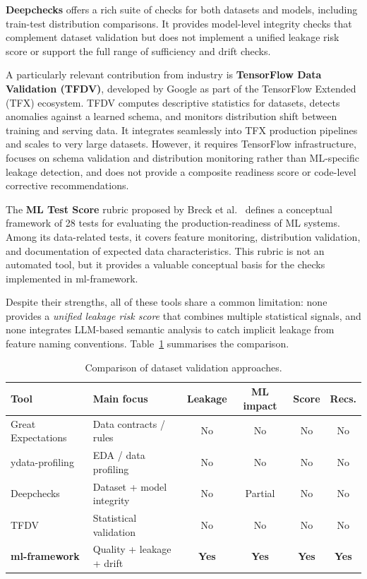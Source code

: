 \documentclass[12pt,a4paper]{report}
\newcommand{\tblhead}{\rowcolor{tblHeadBg}\color{white}\bfseries}
\begin{document}
\textbf{Deepchecks} \cite{deepchecks} offers a rich suite of checks for both datasets and
models, including train-test distribution comparisons.  It provides model-level integrity
checks that complement dataset validation but does not implement a unified leakage risk
score or support the full range of sufficiency and drift checks.

A particularly relevant contribution from industry is \textbf{TensorFlow Data Validation
(TFDV)}, developed by Google as part of the TensorFlow Extended (TFX) ecosystem.  TFDV
computes descriptive statistics for datasets, detects anomalies against a learned schema, and
monitors distribution shift between training and serving data.  It integrates seamlessly into
TFX production pipelines and scales to very large datasets.  However, it requires TensorFlow
infrastructure, focuses on schema validation and distribution monitoring rather than ML-specific
leakage detection, and does not provide a composite readiness score or code-level corrective
recommendations.

The \textbf{ML Test Score} rubric proposed by Breck et al.\ \cite{breck2019} defines a
conceptual framework of 28 tests for evaluating the production-readiness of ML systems.
Among its data-related tests, it covers feature monitoring, distribution validation, and
documentation of expected data characteristics.  This rubric is not an automated tool, but
it provides a valuable conceptual basis for the checks implemented in ml-framework.

Despite their strengths, all of these tools share a common limitation: none provides a
\emph{unified leakage risk score} that combines multiple statistical signals, and none integrates
LLM-based semantic analysis to catch implicit leakage from feature naming conventions.
Table~\ref{tab:tool_comparison} summarises the comparison.

\begin{table}[!ht]
\centering
\caption{Comparison of dataset validation approaches.}
\label{tab:tool_comparison}
\scriptsize
{}
\begin{tabularx}{\textwidth}{lXcccc}
\toprule
\tblhead \textbf{Tool} & \textbf{Main focus} & \textbf{Leakage} & \textbf{ML impact} & \textbf{Score} & \textbf{Recs.} \\
\midrule
Great Expectations & Data contracts / rules  & No  & No  & No  & No \\
ydata-profiling    & EDA / data profiling     & No  & No  & No  & No \\
Deepchecks         & Dataset + model integrity & No  & Partial & No & No \\
TFDV               & Statistical validation    & No  & No  & No  & No \\
\textbf{ml-framework} & Quality + leakage + drift & \textbf{Yes} & \textbf{Yes} & \textbf{Yes} & \textbf{Yes} \\
\bottomrule
\end{tabularx}
\end{table}
\end{document}
